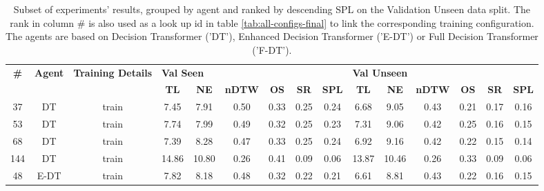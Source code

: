 \begin{table}
\centering
\caption{\label{tab:reward_scale}Subset of experiments' results, grouped by agent and ranked by descending SPL on the Validation Unseen data split. The rank in column \# is also used as a look up id in table \ref{tab:all-configs-final} to link the corresponding training configuration.     \newline The agents are based on Decision Transformer ('DT'), Enhanced Decision Transformer ('E-DT') or Full Decision Transformer ('F-DT').}
\begin{tabular}{@{\hskip3pt}c@{\hskip3pt}c@{\hskip3pt}c@{\hskip3pt}c@{\hskip3pt}c@{\hskip3pt}c@{\hskip3pt}c@{\hskip3pt}c@{\hskip3pt}c@{\hskip3pt}c@{\hskip3pt}c@{\hskip3pt}c@{\hskip3pt}c@{\hskip3pt}c@{\hskip3pt}c}
\toprule
\textbf{\#} & \textbf{Agent} & \textbf{Training Details} & \multicolumn{6}{l}{\textbf{Val Seen}} & \multicolumn{6}{l}{\textbf{Val Unseen}} \\
 \textbf{~} &     \textbf{~} &                \textbf{~} &       \textbf{TL} & \textbf{NE} & \textbf{nDTW} & \textbf{OS} & \textbf{SR} & \textbf{SPL} &         \textbf{TL} & \textbf{NE} & \textbf{nDTW} & \textbf{OS} & \textbf{SR} & \textbf{SPL} \\
\midrule
         37 &             DT &                     train &              7.45 &        7.91 &          0.50 &        0.33 &        0.25 &         0.24 &                6.68 &        9.05 &          0.43 &        0.21 &        0.17 &         0.16 \\
         53 &             DT &                     train &              7.74 &        7.99 &          0.49 &        0.32 &        0.25 &         0.23 &                7.31 &        9.06 &          0.42 &        0.25 &        0.16 &         0.15 \\
         68 &             DT &                     train &              7.39 &        8.28 &          0.47 &        0.33 &        0.25 &         0.24 &                6.92 &        9.16 &          0.42 &        0.22 &        0.15 &         0.14 \\
        144 &             DT &                     train &             14.86 &       10.80 &          0.26 &        0.41 &        0.09 &         0.06 &               13.87 &       10.46 &          0.26 &        0.33 &        0.09 &         0.06 \\
         48 &           E-DT &                     train &              7.82 &        8.18 &          0.48 &        0.32 &        0.22 &         0.21 &                6.61 &        8.81 &          0.43 &        0.22 &        0.16 &         0.15 \\

\end{tabular}
\end{table}
